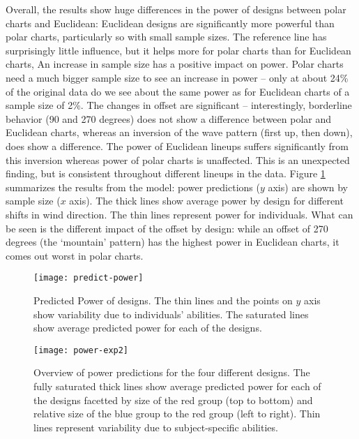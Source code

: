 

Overall, the results show huge differences in the power of designs between polar charts and Euclidean: Euclidean designs are significantly more powerful than polar charts, particularly so with small sample sizes. 
 The reference line has surprisingly little influence, but it helps more for  polar charts than for Euclidean charts,
An increase in sample size has a positive impact on power. Polar charts need a much bigger sample size to see an increase in power -- only at about 24\% of the original data do we see about the same power as for Euclidean charts of a sample size of 2\%.
The  changes in offset are significant -- interestingly, borderline behavior (90 and 270 degrees) does not show a difference between polar and Euclidean charts, whereas an inversion of the wave pattern (first up, then down), does show a difference. The power of Euclidean lineups suffers significantly  from this inversion whereas power of polar charts is unaffected. This is an unexpected finding, but is consistent throughout different lineups in the data. Figure \ref{fig:power} summarizes the results from the model: power predictions ($y$ axis) are shown by sample size ($x$ axis). The thick lines show average power by design for different shifts in wind direction. The thin lines represent power for individuals. What can be seen is the different impact of the offset by design: while  an offset of 270 degrees (the `mountain' pattern) has the highest power in Euclidean charts, it comes out worst in polar charts.

\begin{figure}[htbp] %
   \centering
   \texttt{[image: predict-power]} 
   \caption{Predicted Power of designs.  The thin lines and the points on $y$ axis show  variability due to individuals' abilities. The saturated lines show average predicted power for each of the designs.}
   \label{fig:power}
\end{figure}

\begin{figure*}[hbtp] %
   \centering
   \texttt{[image: power-exp2]} 
   \caption{Overview of power predictions for the four different designs. The fully saturated thick lines show average predicted power for each of the designs facetted by size of the red group (top to bottom) and relative size of the blue group to the red group (left to right). Thin lines represent variability due to subject-specific abilities. }
   \label{fig:power2}
\end{figure*}

